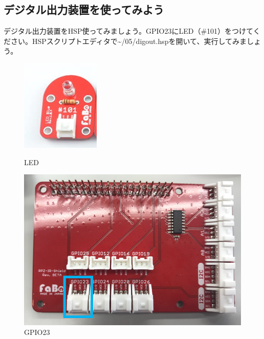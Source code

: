 \subsection{デジタル出力装置を使ってみよう}
デジタル出力装置をHSP使ってみましょう。GPIO23にLED（\#101）をつけてください。HSPスクリプトエディタで\textasciitilde /05/digout.hspを開いて、実行してみましょう。\\
\begin{figure}[H]
  \begin{minipage}[t]{0.3\columnwidth}
    \centering
 \includegraphics[width=\linewidth]{images/chap05/text05-img026.png}
    \caption{LED}
  \end{minipage}
  \begin{minipage}[t]{0.5\columnwidth}
    \centering
    \includegraphics[width=\linewidth]{images/chap05/text05-img027.png}
    \caption{GPIO23}
  \end{minipage}
\end{figure}

